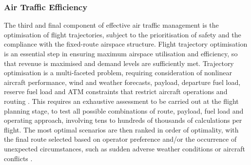 

\subsubsection{Air Traffic Efficiency}
The third and final component of effective air traffic management is the optimisation of flight trajectories, subject to the prioritisation of safety and the compliance with the fixed-route airspace structure. Flight trajectory optimisation is an essential step in ensuring maximum airspace utilisation and efficiency, so that revenue is maximised and demand levels are sufficiently met. Trajectory optimisation is a multi-faceted problem, requiring consideration of nonlinear aircraft performance, wind and weather forecasts, payload, departure fuel load, reserve fuel load and ATM constraints that restrict aircraft operations and routing \cite{Soler2015}. This requires an exhaustive assessment to be carried out at the flight planning stage, to test all possible combinations of route, payload, fuel load and operating approach, involving tens to hundreds of thousands of calculations per flight. The most optimal scenarios are then ranked in order of optimality, with the final route selected based on operator preference and/or the occurrence of unexpected circumstances, such as sudden adverse weather conditions or aircraft conflicts \cite{Altus}.

